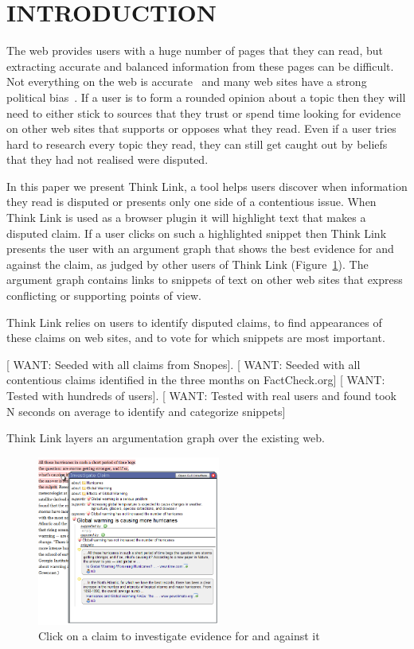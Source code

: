 \documentclass{chi2009}
\newcommand{\want}[1]{{[\color{blue} WANT: #1]}}
\begin{document}

\section{INTRODUCTION}

The web provides users with a huge number of pages that they can read, but extracting accurate and balanced information from these pages can be difficult. Not everything on the web is accurate~\cite{Mintz2002,Neumann2003,Resnik1998,Zhou2004} and many web sites have a strong political bias~\cite{Herman2002,Gentzkow2007}. If a user is to form a rounded opinion about a topic then they will need to either stick to sources that they trust or spend time looking for evidence on other web sites that supports or opposes what they read. Even if a user tries hard to research every topic they read, they can still get caught out by beliefs that they had not realised were disputed.

In this paper we present Think Link, a tool helps users discover when information they read is disputed or presents only one side of a contentious issue. When Think Link is used as a browser plugin it will highlight text that makes a disputed claim. If a user clicks on such a highlighted snippet then Think Link presents the user with an argument graph that shows the best evidence for and against the claim, as judged by other users of Think Link (Figure~\ref{claimview}). The argument graph contains links to snippets of text on other web sites that express conflicting or supporting points of view.

Think Link relies on users to identify disputed claims, to find appearances of these claims on web sites, and to vote for which snippets are most important.

\want{Seeded with all claims from Snopes}.
\want{Seeded with all contentious claims identified in the three months on FactCheck.org}
\want{Tested with hundreds of users}.
\want{Tested with real users and found took N seconds on average to identify and categorize snippets}

Think Link layers an argumentation graph over the existing web. 

\begin{figure}[tb]
	\begin{center}
	\includegraphics[width=6cm]{../screenshots/claim_popup_crop2.png}
	\caption{Click on a claim to investigate evidence for and against it}
	\label{claimview}
	\end{center}
\end{figure}
\end{document}
